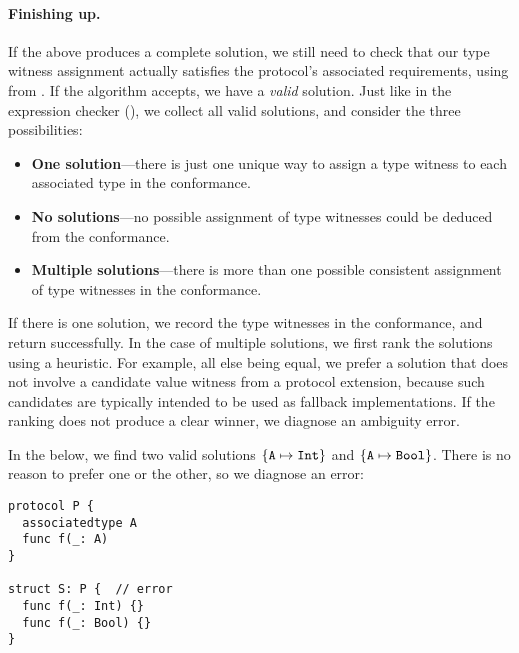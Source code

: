 \documentclass[../generics]{subfiles}
\begin{document}
\paragraph{Finishing up.}
If the above produces a complete solution, we still need to check that our type witness assignment actually satisfies the protocol's associated requirements, using  from . If the algorithm accepts, we have a \emph{valid} solution. Just like in the expression checker (), we collect all valid solutions, and consider the three possibilities:
\begin{itemize}
\item \textbf{One solution}---there is just one unique way to assign a type witness to each associated type in the conformance.
\item \textbf{No solutions}---no possible assignment of type witnesses could be deduced from the conformance.
\item \textbf{Multiple solutions}---there is more than one possible consistent assignment of type witnesses in the conformance.
\end{itemize}
If there is one solution, we record the type witnesses in the conformance, and return successfully. In the case of multiple solutions, we first rank the solutions using a heuristic. For example, all else being equal, we prefer a solution that does not involve a candidate value witness from a protocol extension, because such candidates are typically intended to be used as fallback implementations. If the ranking does not produce a clear winner, we diagnose an ambiguity error.

\begin{example}\label{ambiguous associated type example}
In the below, we find two valid solutions $\{\texttt{A} \mapsto \texttt{Int}\}$ and $\{\texttt{A} \mapsto \texttt{Bool}\}$. There is no reason to prefer one or the other, so we diagnose an error:
\begin{Verbatim}
protocol P {
  associatedtype A
  func f(_: A)
}

struct S: P {  // error
  func f(_: Int) {}
  func f(_: Bool) {}
}
\end{Verbatim}
\end{example}
\end{document}
